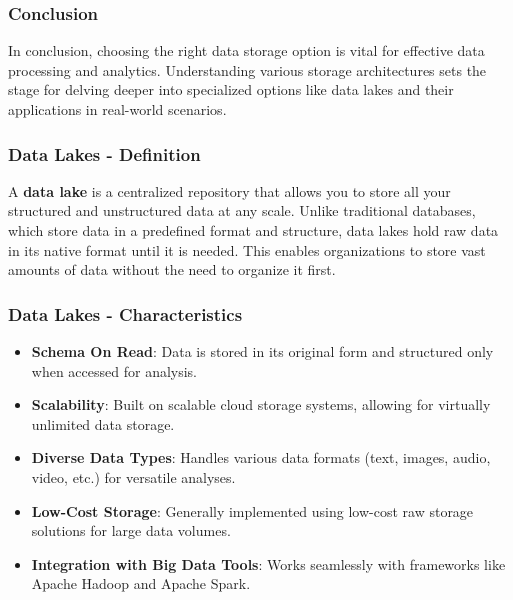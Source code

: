 \documentclass[aspectratio=169]{beamer}
\begin{document}
\begin{frame}[fragile]
    \frametitle{Conclusion}
    In conclusion, choosing the right data storage option is vital for effective data processing and analytics. Understanding various storage architectures sets the stage for delving deeper into specialized options like data lakes and their applications in real-world scenarios.
\end{frame}

\begin{frame}[fragile]
    \frametitle{Data Lakes - Definition}
    A \textbf{data lake} is a centralized repository that allows you to store all your structured and unstructured data at any scale. Unlike traditional databases, which store data in a predefined format and structure, data lakes hold raw data in its native format until it is needed. This enables organizations to store vast amounts of data without the need to organize it first.
\end{frame}

\begin{frame}[fragile]
    \frametitle{Data Lakes - Characteristics}
    \begin{itemize}
        \item \textbf{Schema On Read}: Data is stored in its original form and structured only when accessed for analysis.
        \item \textbf{Scalability}: Built on scalable cloud storage systems, allowing for virtually unlimited data storage.
        \item \textbf{Diverse Data Types}: Handles various data formats (text, images, audio, video, etc.) for versatile analyses.
        \item \textbf{Low-Cost Storage}: Generally implemented using low-cost raw storage solutions for large data volumes.
        \item \textbf{Integration with Big Data Tools}: Works seamlessly with frameworks like Apache Hadoop and Apache Spark.
    \end{itemize}
\end{frame}
\end{document}

